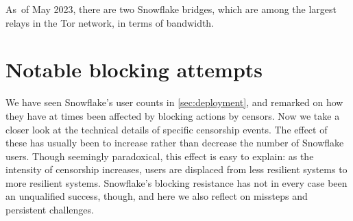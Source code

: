 \documentclass[letterpaper,twocolumn]{article}
\begin{document}
As~of May 2023,
there are two Snowflake bridges,
which are among the largest relays in the Tor network,
in terms of bandwidth.



\section{Notable blocking attempts}
\label{sec:block}

We have seen Snowflake's user counts in \autoref{sec:deployment},
and remarked on how they have at times been affected by blocking actions by censors.
Now we take a closer look at the technical details of specific censorship events.
The effect of these has usually been to increase rather than decrease
the number of Snowflake users.
Though seemingly paradoxical, this effect is easy to explain:
as the intensity of censorship increases,
users are displaced from less resilient systems
to more resilient systems.
Snowflake's blocking resistance has not in every case been an unqualified success,
though, and here we also reflect on missteps
and persistent challenges.
\end{document}
